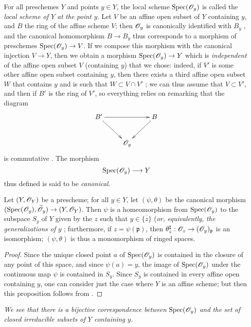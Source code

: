 For all preschemes $Y$ and points $y\in Y$, the local scheme $\operatorname{Spec}(\mathscr{O}_y)$
is called the \emph{local scheme of $Y$ at the point $y$}.
Let $V$ be an affine open subset of $Y$ containing $y$, and $B$ the ring of the affine scheme $V$;
then $\mathscr{O}_y$ is canonically identified with $B_y$ , and the canonical homomorphism $B\to B_y$ thus corresponds  to a morphism of preschemes $\Spec(\sh{O}_y)\to V$.
If we compose this morphism with the canonical injection $V\to Y$, then we obtain a morphism $\Spec(\sh{O}_y)\to Y$ which is \emph{independent} of the affine open subset $V$ (containing $y$) that we chose: indeed, if $V'$ is some other affine open subset containing $y$, then there exists a third affine open subset $W$ that contains $y$ and is such that $W\subset V\cap V'$ ;
we can thus assume that $V\subset V'$, and then if $B'$ is the ring of $V'$, so everything relies on remarking that the diagram
\[
  \xymatrix{
    B'\ar[rr]\ar[dr] & &
    B\ar[dl]\\
    & \sh{O}_y
  }
\]
is commutative .
The morphism
\[
  \Spec(\sh{O}_y)\to Y
\]
thus defined is said to be {\it canonical}.

\begin{proposition}[2.4.2]
\label{I.2.4.2}
Let $(Y,\mathscr{O}_Y)$ be a prescheme;
for all $y\in Y$, let $(\psi,\theta)$ be the canonical morphism $(\Spec(\sh{O}_y),\widetilde{\sh{O}}_y)\to(Y,\sh{O}_Y)$.
Then $\psi$ is a homeomorphism from $\operatorname{Spec}(\mathscr{O}_y)$ to the subspace $S_y$ of $Y$ given by the $z$ such that $y\in\overline{\{z\}}$ (\emph{or, equivalently, the generalizations of $y$ };
furthermore, if $z=\psi(\mathfrak{p})$, then $\theta_z^\sharp:\sh{O}_z\to(\sh{O}_y)_\mathfrak{p}$ is an isomorphism;
$(\psi,\theta)$ is thus a monomorphism of ringed spaces.
\end{proposition}

\begin{proof}
\label{proof-1.2.4.2}
Since the unique closed point $a$ of $\operatorname{Spec}(\mathscr{O}_y)$ is contained in the closure of any point of this space, and since $\psi(a)=y$, the image of $\operatorname{Spec}(\mathscr{O}_y)$ under the continuous map $\psi$ is contained in $S_y$.
Since $S_y$ is contained in every affine open containing $y$, one can consider just the case where $Y$ is an affine scheme;
but then this proposition follows from .
\end{proof}

\emph{We see  that there is a bijective correspondence between $\operatorname{Spec}(\mathscr{O}_y)$ and the set of closed irreducible subsets of $Y$ containing $y$.}


